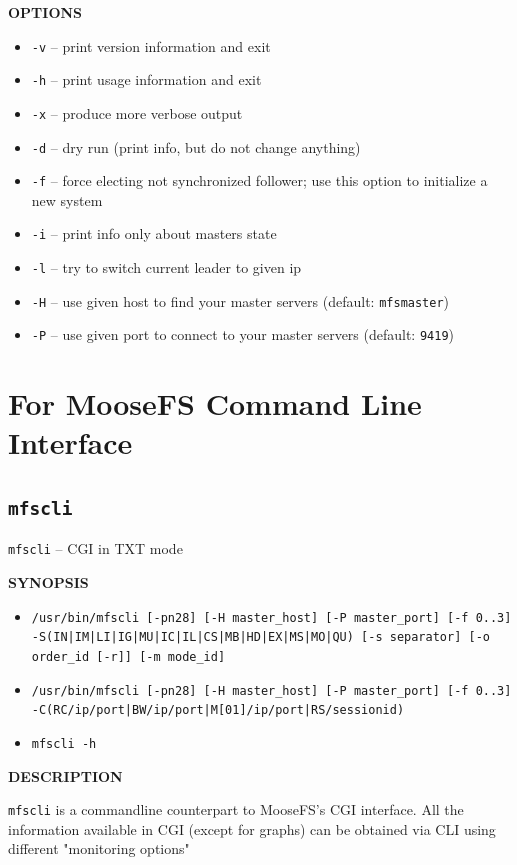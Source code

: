 \documentclass[a4paper,11pt,english]{report}
\def\code#1{\texttt{#1}}
\begin{document}
				\bigskip
				\textbf{OPTIONS}
				\begin{itemize}
					\item \code{-v} -- print version information and exit
					\item \code{-h} -- print usage information and exit
					\item \code{-x} -- produce more verbose output
					\item \code{-d} -- dry run (print info, but do not change anything)
					\item \code{-f} -- force electing not synchronized follower;  use  this  option  to initialize a new system
					\item \code{-i} -- print info only about masters state
					\item \code{-l} -- try to switch current leader to given ip
					\item \code{-H} -- use given host to find your master servers (default: \code{mfsmaster})
					\item \code{-P} -- use given port to connect to your master servers (default: \code{9419})
				\end{itemize}
		\section{For MooseFS Command Line Interface}
			\subsection{\code{mfscli}}
				\code{mfscli} -- CGI in TXT mode
				\bigskip
				
				\textbf{SYNOPSIS}
				\begin{itemize}
					\item \code{/usr/bin/mfscli [-pn28] [-H master\_host] [-P master\_port] [-f 0..3] \\
					-S(IN|IM|LI|IG|MU|IC|IL|CS|MB|HD|EX|MS|MO|QU) [-s separator] [-o order\_id [-r]] [-m mode\_id]}

					\item \code{/usr/bin/mfscli [-pn28] [-H master\_host] [-P master\_port] [-f 0..3] \\
					-C(RC/ip/port|BW/ip/port|M[01]/ip/port|RS/sessionid)}
					
					\item \code{mfscli -h}
				\end{itemize}
				\bigskip
				
				\textbf{DESCRIPTION}
				
				\code{mfscli} is a commandline counterpart to MooseFS's CGI interface. All the information available in CGI (except for graphs) can be obtained via CLI using different "monitoring options"
				\bigskip
				
\end{document}
